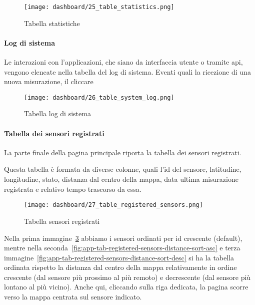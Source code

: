 \begin{figure}[H]
  \centering
  \texttt{[image: dashboard/25\_table\_statistics.png]}
  \caption{Tabella statistiche}
  \label{fig:app-tab-statistics}
\end{figure}

\newpage

\paragraph{Log di sistema}

Le interazioni con l'applicazioni, che siano da interfaccia utente o tramite \acrshort{api}, vengono elencate
nella tabella del log di sistema. Eventi quali la ricezione di una nuova misurazione, il cliccare

\begin{figure}[H]
  \centering
  \texttt{[image: dashboard/26\_table\_system\_log.png]}
  \caption{Tabella log di sistema}
  \label{fig:app-tab-system-log}
\end{figure}

\newpage

\paragraph{Tabella dei sensori registrati}

La parte finale della pagina principale riporta la tabella dei sensori registrati.

Questa tabella è formata da diverse colonne, quali l'id del sensore, latitudine, longitudine, stato,
distanza dal centro della mappa, data ultima misurazione registrata e relativo tempo trascorso da essa.

\begin{figure}[H]
  \centering
  \texttt{[image: dashboard/27\_table\_registered\_sensors.png]}
  \caption{Tabella sensori registrati}
  \label{fig:app-tab-registered-sensors}
\end{figure}

Nella prima immagine~\ref{fig:app-tab-registered-sensors} abbiamo i sensori ordinati per id crescente (default),
mentre nella seconda~\ref{fig:app-tab-registered-sensors-distance-sort-asc} e
terza immagine~\ref{fig:app-tab-registered-sensors-distance-sort-desc} si ha la tabella ordinata rispetto
la distanza dal centro della mappa relativamente in ordine crescente (dal sensore più prossimo al più remoto) e
decrescente (dal sensore più lontano al più vicino).
Anche qui, cliccando sulla riga dedicata, la pagina scorre verso la mappa centrata sul sensore indicato.


